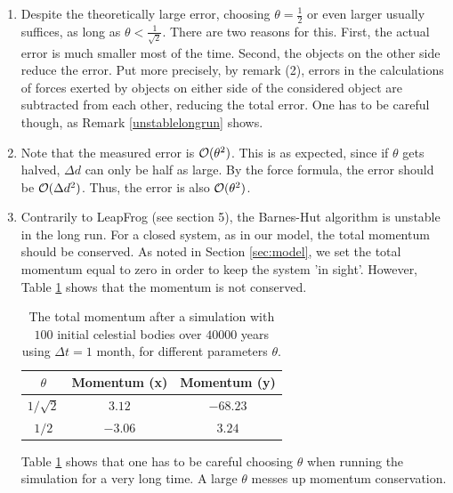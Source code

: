 \begin{enumerate}
\item Despite the theoretically large error, choosing $\theta = \frac{1}{2}$ or even larger usually suffices, as long as $\theta < \frac{1}{\sqrt{2}}$. There are two reasons for this. First, the actual error is much smaller most of the time. Second, the objects on the other side reduce the error. Put more precisely, by remark (2), errors in the calculations of forces exerted by objects on either side of the considered object are subtracted from each other, reducing the total error. One has to be careful though, as Remark \ref{unstablelongrun} shows.
\item Note that the measured error is $\mathcal{O}(\theta^2)$. This is as expected, since if $\theta$ gets halved, $\Delta d$ can only be half as large. By the force formula, the error should be $\mathcal{O}(\Delta d^2)$. Thus, the error is also $\mathcal{O}(\theta^2)$.
\item\label{unstablelongrun} Contrarily to LeapFrog (see section 5), the Barnes-Hut algorithm is unstable in the long run. For a closed system, as in our model, the total momentum should be conserved. As noted in Section \ref{sec:model}, we set the total momentum equal to zero in order to keep the system 'in sight'. However, Table \ref{tab:barneshutmomentum} shows that the momentum is not conserved.
\begin{table}[H]
\begin{tabular}{c|c|c}
$\theta$ & Momentum (x) & Momentum (y)\\
\hline
$1/\sqrt{2}$ & $3.12$ & $-68.23$\\
$1/2$ & $-3.06$ & $3.24$
\end{tabular}
\caption{The total momentum after a simulation with $100$ initial celestial bodies over $40000$ years using $\Delta t = 1$ month, for different parameters $\theta$.}
\label{tab:barneshutmomentum}
\end{table}
Table \ref{tab:barneshutmomentum} shows that one has to be careful choosing $\theta$ when running the simulation for a very long time. A large $\theta$ messes up momentum conservation.
\end{enumerate}
